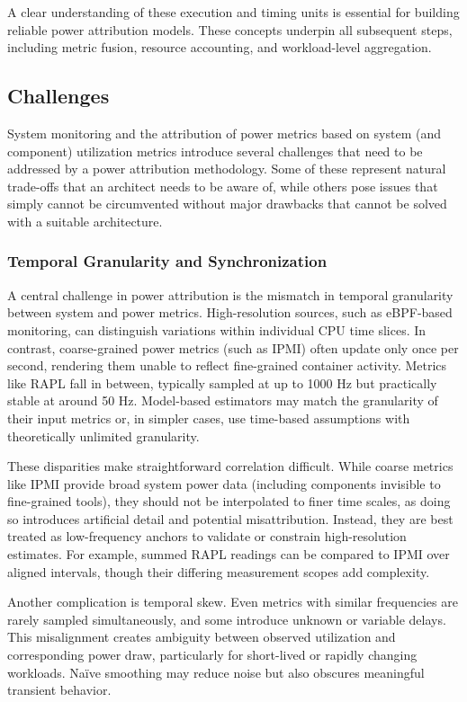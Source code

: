 A clear understanding of these execution and timing units is essential for building reliable power attribution models. These concepts underpin all subsequent steps, including metric fusion, resource accounting, and workload-level aggregation.

\subsection{Challenges}
\label{ch:limitations}

System monitoring and the attribution of power metrics based on system (and component) utilization metrics introduce several challenges that need to be addressed by a power attribution methodology. Some of these represent natural trade-offs that an architect needs to be aware of, while others pose issues that simply cannot be circumvented without major drawbacks that cannot be solved with a suitable architecture.

\subsubsection{Temporal Granularity and Synchronization}

A central challenge in power attribution is the mismatch in temporal granularity between system and power metrics. High-resolution sources, such as eBPF-based monitoring, can distinguish variations within individual CPU time slices. In contrast, coarse-grained power metrics (such as IPMI) often update only once per second, rendering them unable to reflect fine-grained container activity. Metrics like RAPL fall in between, typically sampled at up to 1000 Hz but practically stable at around 50 Hz. Model-based estimators may match the granularity of their input metrics or, in simpler cases, use time-based assumptions with theoretically unlimited granularity.

These disparities make straightforward correlation difficult. While coarse metrics like IPMI provide broad system power data (including components invisible to fine-grained tools), they should not be interpolated to finer time scales, as doing so introduces artificial detail and potential misattribution. Instead, they are best treated as low-frequency anchors to validate or constrain high-resolution estimates. For example, summed RAPL readings can be compared to IPMI over aligned intervals, though their differing measurement scopes add complexity.

Another complication is temporal skew. Even metrics with similar frequencies are rarely sampled simultaneously, and some introduce unknown or variable delays. This misalignment creates ambiguity between observed utilization and corresponding power draw, particularly for short-lived or rapidly changing workloads. Naïve smoothing may reduce noise but also obscures meaningful transient behavior.

